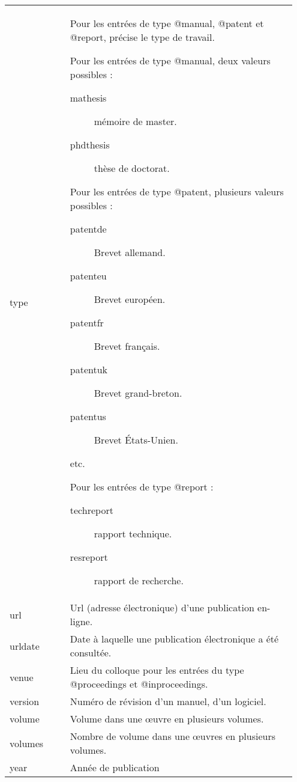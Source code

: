 \begin{longtable}{p{0.2\linewidth}p{0.75\linewidth}}
					\\
	type			& Pour les entrées de type  @manual, @patent et @report, précise le type de travail.
	
	 Pour les entrées de type @manual, deux valeurs possibles :
					\begin{description}
						\item[mathesis]mémoire de master.
						\item[phdthesis]thèse de doctorat.
					\end{description}
					
					 Pour les entrées de type @patent, plusieurs  valeurs possibles : 
					 
					 
					 \begin{description}
						\item[patentde] Brevet allemand.
						\item[patenteu] Brevet européen.
						\item[patentfr] Brevet français.
						\item[patentuk] Brevet grand-breton.
						\item[patentus] Brevet États-Unien.
						\item[etc.]
					 \end{description}
					
					Pour les entrées de type @report : 
					\begin{description}
						\item[techreport]rapport technique.
						\item[resreport]rapport de recherche.
					\end{description}
					
					\\	
	url 			& Url (adresse électronique) d'une publication en-ligne. \\
	urldate		& Date à laquelle une publication électronique a été consultée. \\
	venue			& Lieu du colloque pour les entrées du type @proceedings et @inproceedings. \\
	version		& Numéro de révision d'un manuel, d'un logiciel. \\
	volume		& Volume dans une œuvre en plusieurs volumes. \\
	volumes		& Nombre de volume dans une œuvres en plusieurs volumes. \\
	year			& Année de publication 				\\
	
\end{longtable}


